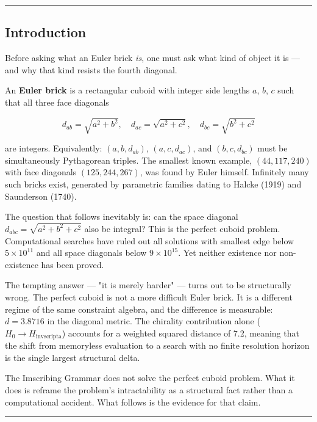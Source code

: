 \documentclass[12pt,a4paper]{article}
\begin{document}
\begin{center}
\rule{0.5\textwidth}{0.4pt}
\end{center}

\subsection{Introduction}

Before asking what an Euler brick \emph{is}, one must ask what kind of object it is --- and why that kind resists the fourth diagonal.

An \textbf{Euler brick} is a rectangular cuboid with integer side lengths $a$, $b$, $c$ such that all three face diagonals

\[d_{ab} = \sqrt{a^2 + b^2}, \quad d_{ac} = \sqrt{a^2 + c^2}, \quad d_{bc} = \sqrt{b^2 + c^2}\]

are integers. Equivalently: $(a,b,d_{ab})$, $(a,c,d_{ac})$, and $(b,c,d_{bc})$ must be simultaneously Pythagorean triples. The smallest known example, $(44, 117, 240)$ with face diagonals $(125, 244, 267)$, was found by Euler himself. Infinitely many such bricks exist, generated by parametric families dating to Halcke (1919) and Saunderson (1740).

The question that follows inevitably is: can the space diagonal $d_{abc} = \sqrt{a^2 + b^2 + c^2}$ also be integral? This is the perfect cuboid problem. Computational searches have ruled out all solutions with smallest edge below $5 \times 10^{11}$ and all space diagonals below $9 \times 10^{15}$. Yet neither existence nor non-existence has been proved.

The tempting answer --- "it is merely harder" --- turns out to be structurally wrong. The perfect cuboid is not a more difficult Euler brick. It is a different regime of the same constraint algebra, and the difference is measurable: $d = 3.8716$ in the diagonal metric. The chirality contribution alone ($H_0 \to H_{\text{invscripta}}$) accounts for a weighted squared distance of 7.2, meaning that the shift from memoryless evaluation to a search with no finite resolution horizon is the single largest structural delta.

The Imscribing Grammar does not solve the perfect cuboid problem. What it does is reframe the problem's intractability as a structural fact rather than a computational accident. What follows is the evidence for that claim.

\begin{center}
\rule{0.5\textwidth}{0.4pt}
\end{center}
\end{document}

